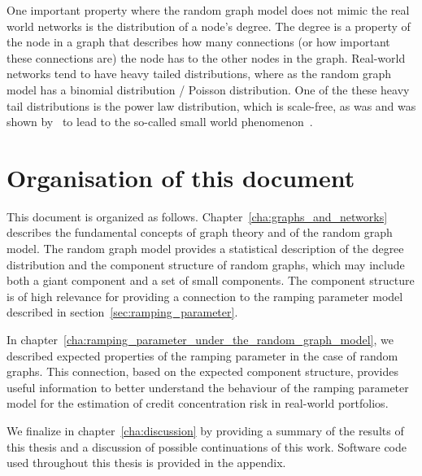 \documentclass[12pt,beltcrest]{ociamthesis} %
\begin{document}
One important property where the random graph model does not mimic the real world networks is the distribution of a node's degree.
The degree is a property of the node in a graph that describes how many connections (or how important these connections are) the node has to the other nodes in the graph.
Real-world networks tend to have heavy tailed distributions, where as the random graph model has a binomial distribution / Poisson distribution.
One of the these heavy tail distributions is the power law distribution, which is scale-free, as was and was shown by~\cite{Albert:2002p4071} to lead to the so-called small world phenomenon~\cite{Watts:1998db}.





\section{Organisation of this document} %
\label{sec:organisation_of_this_document}

This document is organized as follows.
Chapter~\ref{cha:graphs_and_networks} describes the fundamental concepts of graph theory and of the random graph model.
The random graph model provides a statistical description of the degree distribution and the component structure of random graphs, which may include both a giant component and a set of small components.
The component structure is of high relevance for providing a connection to the ramping parameter model described in section~\ref{sec:ramping_parameter}.

In chapter~\ref{cha:ramping_parameter_under_the_random_graph_model}, we described expected properties of the ramping parameter in the case of random graphs.
This connection, based on the expected component structure, provides useful information to better understand the behaviour of the ramping parameter model for the estimation of credit concentration risk in real-world portfolios.

We finalize in chapter~\ref{cha:discussion} by providing a summary of the results of this thesis and a discussion of possible continuations of this work.
Software code used throughout this thesis is provided in the appendix.
\end{document}
